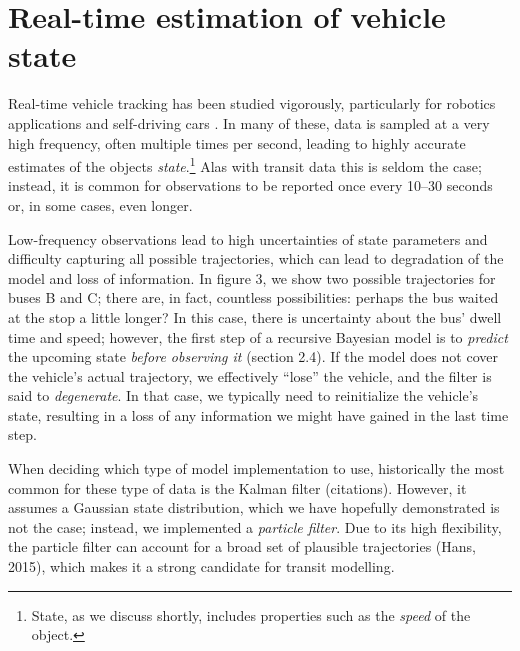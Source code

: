 \section{Real-time estimation of vehicle state}
\label{sec:vehicle_model}
Real-time vehicle tracking has been studied vigorously, particularly for robotics applications and self-driving cars \citep{cn}. In many of these, data is sampled at a very high frequency, often multiple times per second, leading to highly accurate estimates of the objects \emph{state}.\footnote{State, as we discuss shortly, includes properties such as the \emph{speed} of the object.} Alas with transit data this is seldom the case; instead, it is common for observations to be reported once every 10--30 seconds or, in some cases, even longer.

Low-frequency observations lead to high uncertainties of state parameters and difficulty capturing all possible trajectories, which can lead to degradation of the model and loss of information. In figure 3, we show two possible trajectories for buses B and C; there are, in fact, countless possibilities: perhaps the bus waited at the stop a little longer? In this case, there is uncertainty about the bus' dwell time and speed; however, the first step of a recursive Bayesian model is to \emph{predict} the upcoming state \emph{before observing it} (section 2.4). If the model does not cover the vehicle's actual trajectory, we effectively ``lose'' the vehicle, and the filter is said to \emph{degenerate}. In that case, we typically need to reinitialize the vehicle's state, resulting in a loss of any information we might have gained in the last time step.

When deciding which type of model implementation to use, historically the most common for these type of data is the Kalman filter (citations). However, it assumes a Gaussian state distribution, which we have hopefully demonstrated is not the case; instead, we implemented a \emph{particle filter}. Due to its high flexibility, the particle filter can account for a broad set of plausible trajectories (Hans, 2015), which makes it a strong candidate for transit modelling.

